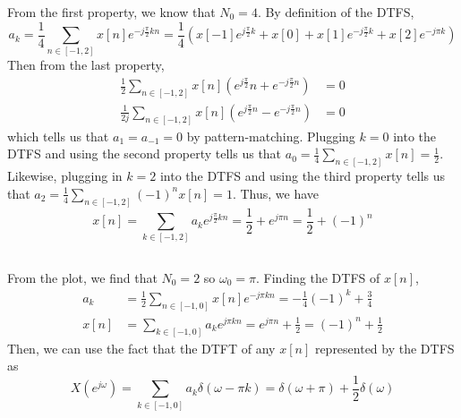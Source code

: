 \documentclass{article}
\begin{document}
From the first property, we know that \(N_0 = 4\).
By definition of the DTFS,
\begin{equation}
    a_k = \frac{1}{4} \sum_{n \in [-1, 2]} x[n] e^{-j \frac{\pi}{2} k n} = \frac{1}{4} (x[-1] e^{j \frac{\pi}{2} k} + x[0] + x[1] e^{-j \frac{\pi}{2} k} + x[2] e^{-j \pi k})
\end{equation}
Then from the last property,
\begin{align}
    \frac{1}{2} \sum_{n \in [-1, 2]} x[n] (e^{j \frac{\pi}{2}} n + e^{-j \frac{\pi}{2} n}) &= 0 \\
    \frac{1}{2j} \sum_{n \in [-1, 2]} x[n] (e^{j \frac{\pi}{2} n} - e^{-j \frac{\pi}{2} n}) &= 0
\end{align}
which tells us that \(a_1 = a_{-1} = 0\) by pattern-matching.
Plugging \(k = 0\) into the DTFS and using the second property tells us that \(a_0 = \frac{1}{4} \sum_{n \in [-1, 2]} x[n] = \frac{1}{2}\).
Likewise, plugging in \(k = 2\) into the DTFS and using the third property tells us that \(a_2 = \frac{1}{4} \sum_{n \in [-1, 2]} (-1)^n x[n] = 1\).
Thus, we have
\begin{equation}
    x[n] = \sum_{k \in [-1, 2]} a_k e^{j \frac{\pi}{2} k n} = \frac{1}{2} + e^{j \pi n} = \frac{1}{2} + (-1)^n
\end{equation}
\begin{center}
\end{center}

\subsection{}

From the plot, we find that \(N_0 = 2\) so \(\omega_0 = \pi\).
Finding the DTFS of \(x[n]\),
\begin{align}
    a_k &= \frac{1}{2} \sum_{n \in [-1, 0]} x[n] e^{-j \pi k n} = -\frac{1}{4} (-1)^k + \frac{3}{4} \\
    x[n] &= \sum_{k \in [-1, 0]} a_k e^{j \pi k n} = e^{j \pi n} + \frac{1}{2} = (-1)^n + \frac{1}{2}
\end{align}
Then, we can use the fact that the DTFT of any \(x[n]\) represented by the DTFS as
\begin{equation}
    X(e^{j \omega}) = \sum_{k \in [-1, 0]} a_k \delta(\omega - \pi k) = \delta(\omega + \pi) + \frac{1}{2} \delta(\omega)
\end{equation}
\end{document}
